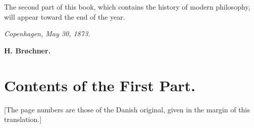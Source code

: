 The second part of this book, which contains the history of modern
philosophy, will appear toward the end of the year.

\textit{Copenhagen, May 30, 1873.}

{\raggedleft\textbf{H. Brøchner.}\hspace*{1.2cm}\par}

\divrule

\chapter*{Contents of the First Part.}

\divrule

{\small [The page numbers are those of the Danish original, given in the
margin of this translation.]\par}
\medskip

